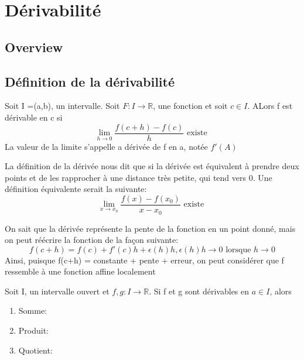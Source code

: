 \documentclass{article}
\begin{document}
\section{Dérivabilité}

\subsection{Overview}

\subsection{Définition de la dérivabilité}

\begin{definition}[Dérivée]
    Soit I =(a,b), un intervalle. Soit $F:I \to \mathbb{R}$, une fonction
    et soit $ c \in I$. ALors f est dérivable en c si
    $$ \lim_{h \to 0} \frac{f(c+h) -f(c)}{h} \text{ existe } $$
    La valeur de la limite s'appelle a dérivée de f en a, notée $f'(A)$
\end{definition}

\begin{remark}
    La définition de la dérivée nous dit que si la dérivée est équivalent
    à prendre deux points et de les rapprocher à une distance très petite,
    qui tend vers 0. Une définition équivalente serait la suivante:
    $$ \lim_{x \to x_0} \frac{f(x) -f(x_0)}{x - x_0} \text{ existe } $$
\end{remark}

\begin{remark}
    On sait que la dérivée représente la pente de la fonction en un
    point donné, mais on peut réécrire la fonction de la façon suivante:
    $$ f(c+h) = f(c) + f'(c)h + \epsilon (h)h, \epsilon (h)h \to 0
    \text{ lorsque } h \to 0$$
    Ainsi, puisque f(c+h) = constante + pente + erreur, on peut considérer
    que f ressemble à une fonction affine localement
\end{remark}

\begin{theorem}
    Soit I, un intervalle ouvert et $f,g:I \to \mathbb{R}$. Si f et g
    sont dérivables en $a \in I$, alors
    \begin{enumerate}
	\item Somme:
	\item Produit:
	\item Quotient:
    \end{enumerate}
\end{theorem}
\end{document}
